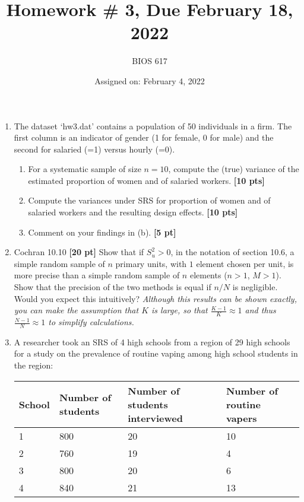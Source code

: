 \documentclass[12pt]{article}
\begin{document}
\title{Homework \# 3, Due February 18, 2022}
\author{BIOS 617}
\date{Assigned on: February 4, 2022}

\maketitle

\begin{enumerate}
\setlength{\itemsep}{15pt}%
\setlength{\parskip}{15pt}%

\item  The dataset `hw3.dat' contains a population of 50 individuals in a firm. The first column is an indicator of gender (1 for female, 0 for male) and the second for salaried (=1) versus hourly (=0).
	\begin{enumerate}
	\item For a systematic sample of size $n=10$, compute the (true) variance of the estimated proportion of women and of salaried workers. {\bf [10 pts]}
	\item Compute the variances under SRS for proportion of women and of salaried workers and the resulting design effects. {\bf [10 pts]}
	\item Comment on your findings in (b). {\bf [5 pt]}
	\end{enumerate}

\item Cochran 10.10 {\bf [20 pt]} Show that if $S_u^2 >0$, in the notation of section 10.6, a simple random sample of $n$ primary units, with $1$ element chosen per unit, is more precise than a simple random sample of $n$ elements ($n>1$, $M>1$). Show that the precision of the two methods is equal if $n/N$ is negligible. Would you expect this intuitively? \emph{Although this results can be shown exactly, you can make the assumption that $K$ is large, so that $\frac{K-1}{K} \approx 1$ and thus $\frac{N-1}{N} \approx 1$ to simplify calculations.}

\item A researcher took an SRS of 4 high schools from a region of 29 high schools for a study on the prevalence of routine vaping among high school students in the region:

\begin{table}[!th]
\centering
\begin{tabular}{p{1in} | p{1in} p{1in} p{1in}}
School & Number of students & Number of students interviewed & Number of routine vapers \\ \hline
1 & 800 & 20 & 10 \\
2 & 760 & 19 & 4 \\
3 & 800 & 20 & 6 \\
4 & 840 & 21 & 13 \\ \hline
\end{tabular}
\end{table}


\end{enumerate}
\end{document}
